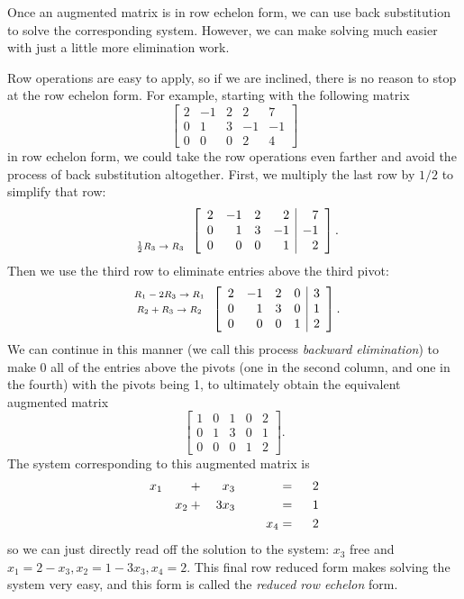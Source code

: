 Once an augmented matrix is in row echelon form, we can use back substitution to solve the corresponding system. However, we can make solving much easier with just a little more elimination work. 

Row operations are easy to apply, so if we are inclined, there is no reason to stop at the row echelon form. For example, starting with the following matrix 
\[\left[ \begin{array}{crcr|r} 2&-1&2&2&7 \\ 0&1&3&-1&-1 \\ 0&0&0&2&4 \end{array} \right]\]
in row echelon form, we could take the row operations even farther and avoid the process of back substitution altogether. First, we multiply the last row by $1/2$ to simplify that row:
\[\begin{array}{c} \text{ }\\ \text{ }\\ \text{\scriptsize $\frac{1}{2} R_3 \to R_3$} \end{array} \left[ \begin{array}{crcr|r} 2&-1&2&2&7 \\ 0&1&3&-1&-1 \\ 0&0&0&1&2 \end{array} \right].\]
Then we use the third row to eliminate entries above the third pivot:
\[\begin{array}{c} \text{\scriptsize $R_1-2R_3 \to R_1$}\\ \text{\scriptsize $R_2+R_3 \to R_2$} \\ \text{ }\end{array}  \left[ \begin{array}{crcr|r} 2&-1&2&0&3 \\ 0&1&3&0&1 \\ 0&0&0&1&2 \end{array} \right].\]
We can continue in this manner (we call this process \emph{backward elimination}) to make 0 all of the entries above the pivots (one in the second column, and one in the fourth) with the pivots being 1, to ultimately obtain the equivalent augmented matrix
\[\left[ \begin{array}{crcr|r} 1&0&1&0&2 \\ 0&1&3&0&1 \\ 0&0&0&1&2 \end{array} \right].\]
The system corresponding to this augmented matrix is
\begin{alignat*}{5}
{}x_1 	&{}	 	&{}		&{}+{}	&{}x_3		&{\hspace{0.2in}}		&{} 		&{}={}	& \ 2   \\
{}			&{} 		&{}x_2 	&{}+{}	&{3}x_3		&{ }							&{} 		&{}={} 	& \ 1 \\
{}			&{}		&{}		&{}	 	&{}			&{ }							&{}x_4	&{}={} 	& \ 2
\end{alignat*}
so we can just directly read off the solution to the system: $x_3$ free and $x_1=2-x_3, x_2=1-3x_3, x_4=2$. This final row reduced form makes solving the system very easy, and this form is called the \emph{reduced row echelon} form. 
 


